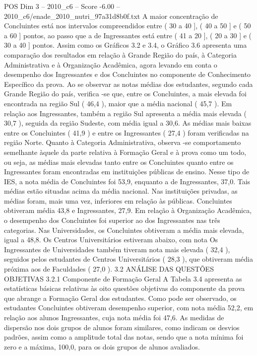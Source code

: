 \begin{textsample}{POS Dim 3 – 2010\_c6 – Score -6.00 – 2010\_c6/enade\_2010\_nutri\_97a31d8b0f.txt}
A maior concentração de Concluintes está nos intervalos compreendidos entre ( 30 a 40 ], ( 40 a 50 ] e ( 50 a 60 ] pontos, ao passo que a de Ingressantes está entre ( 41 a 20 ], ( 20 a 30 ] e ( 30 a 40 ] pontos.
Assim como os Gráficos 3.2 e 3.4, o Gráfico 3.6 apresenta uma comparação dos resultados em relação à Grande Região do país, à Categoria Administrativa e à Organização Acadêmica, agora levando em conta o desempenho dos Ingressantes e dos Concluintes no componente de Conhecimento Específico da prova.
Ao se observar as notas médias dos estudantes, segundo cada Grande Região do país, verifica -se que, entre os Concluintes, a mais elevada foi encontrada na região Sul ( 46,4 ), maior que a média nacional ( 45,7 ).
Em relação aos Ingressantes, também a região Sul apresenta a média mais elevada ( 30,7 ), seguida da região Sudeste, com média igual a 30,6.
As médias mais baixas entre os Concluintes ( 41,9 ) e entre os Ingressantes ( 27,4 ) foram verificadas na região Norte.
Quanto à Categoria Administrativa, observa -se comportamento semelhante àquele da parte relativa à Formação Geral e à prova como um todo, ou seja, as médias mais elevadas tanto entre os Concluintes quanto entre os Ingressantes foram encontradas em instituições públicas de ensino.
Nesse tipo de IES, a nota média de Concluintes foi 53,9, enquanto a de Ingressantes, 37,0.
Tais médias estão situadas acima da média nacional.
Nas instituições privadas, as médias foram, mais uma vez, inferiores em relação às públicas.
Concluintes obtiveram média 43,8 e Ingressantes, 27,9.
Em relação à Organização Acadêmica, o desempenho dos Concluintes foi superior ao dos Ingressantes nas três categorias.
Nas Universidades, os Concluintes obtiveram a média mais elevada, igual a 48,8.
Os Centros Universitários estiveram abaixo, com nota Os Ingressantes de Universidades também tiveram nota mais elevada ( 32,4 ), seguidos pelos estudantes de Centros Universitários ( 28,3 ), que obtiveram média próxima aos de Faculdades ( 27,0 ). 3.2 ANÁLISE DAS QUESTÕES OBJETIVAS 3.2.1 Componente de Formação Geral A Tabela 3.4 apresenta as estatísticas básicas relativas às oito questões objetivas do componente da prova que abrange a Formação Geral dos estudantes.
Como pode ser observado, os estudantes Concluintes obtiveram desempenho superior, com nota média 52,2, em relação aos alunos Ingressantes, cuja nota média foi 47,6.
As medidas de dispersão nos dois grupos de alunos foram similares, como indicam os desvios padrões, assim como a amplitude total das notas, sendo que a nota mínima foi zero e a máxima, 100,0, para os dois grupos de alunos avaliados.

\end{textsample}
